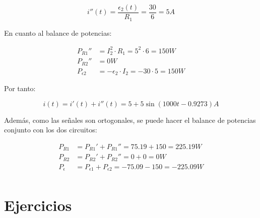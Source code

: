 \documentclass[11pt]{book} %
\begin{document}
\begin{example}
\begin{equation*}
  i''(t) = \dfrac{\epsilon_2(t)}{R_1}=\dfrac{30}{6} = {5}A
\end{equation*}

En cuanto al balance de potencias:

\begin{align*}
  P_{R1}'' &= I_2^2 \cdot R_1=5^2\cdot 6 = {150} W\\
  P_{R2}'' &= {0} W\\
  P_{\epsilon2} &= -\epsilon_2 \cdot I_2 = -30\cdot 5  = {150} W
\end{align*}

Por tanto:

\begin{equation*}
  i(t) = i'(t) + i''(t) = 5 + 5\sin(1000t - 0.9273) A
\end{equation*}

Además, como las señales son ortogonales, se puede hacer el balance de potencias conjunto con los dos circuitos:

\begin{align*}
  P_{R1} &= P_{R1}' + P_{R1}'' = 75.19+150={225.19} W\\
  P_{R2} &= P_{R2}' + P_{R2}'' = 0+0 = {0} W\\
  P_{\epsilon} &= P_{\epsilon1} + P_{\epsilon2} = -75.09-150=-{225.09} W\\
\end{align*}
\end{example}

	
	\section{Ejercicios}
	
\end{document}

